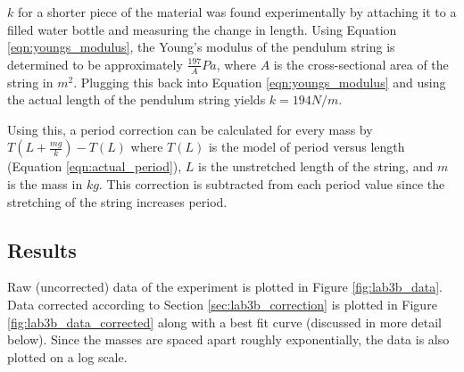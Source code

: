 \documentclass[aps,twocolumn,secnumarabic,nobalancelastpage,amsmath,amssymb,nofootinbib,floatfix,letterpaper]{revtex4}
\begin{document}
\(k\) for a shorter piece of the material was found experimentally by attaching it to a filled water bottle and
measuring the change in length. Using Equation \ref{eqn:youngs_modulus}, the Young's modulus of the pendulum string is
determined to be approximately \(\frac{197}{A}\si{Pa}\), where \(A\) is the cross-sectional area of the string in \(\si{m^2}\).
Plugging this back into Equation \ref{eqn:youngs_modulus} and using the actual length of the pendulum string yields
\(k = 194\si{N/m}\).

Using this, a period correction can be calculated for every mass by \(T(L + \frac{mg}{k}) - T(L)\) where \(T(L)\) is the
model of period versus length (Equation \ref{eqn:actual_period}), \(L\) is the unstretched length of the string, and
\(m\) is the mass in \(\si{kg}\). This correction is subtracted from each period value since the stretching of the
string increases period.

\subsection{Results}

Raw (uncorrected) data of the experiment is plotted in Figure \ref{fig:lab3b_data}. Data corrected according to Section
\ref{sec:lab3b_correction} is plotted in Figure \ref{fig:lab3b_data_corrected} along with a best fit curve (discussed in
more detail below). Since the masses are spaced apart roughly exponentially, the data is also plotted on a log scale.
\end{document}
